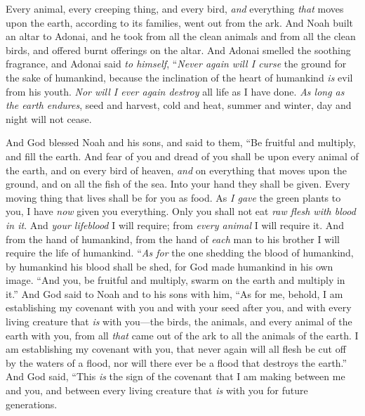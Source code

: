 \begin{biblechapter}
\verse Every animal, every creeping thing, and every bird, \textit{and} everything \textit{that} moves upon the earth, according to its families, went out from the ark.
\verse And Noah built an altar to Adonai, and he took from all the clean animals and from all the clean birds, and offered burnt offerings on the altar.
\verse And Adonai smelled the soothing fragrance, and Adonai said \textit{to himself}, “\textit{Never again will I curse} the ground for the sake of humankind, because the inclination of the heart of humankind \textit{is} evil from his youth. \textit{Nor will I ever again destroy} all life as I have done.
\verse \textit{As long as the earth endures}, seed and harvest, cold and heat, summer and winter, day and night will not cease.
\end{biblechapter}

\begin{biblechapter} %
 And God blessed Noah and his sons, and said to them, “Be fruitful and multiply, and fill the earth.
\verse And fear of you and dread of you shall be upon every animal of the earth, and on every bird of heaven, \textit{and} on everything that moves upon the ground, and on all the fish of the sea. Into your hand they shall be given.
\verse Every moving thing that lives shall be for you as food. As \textit{I gave} the green plants to you, I have \textit{now} given you everything.
\verse Only you shall not eat \textit{raw flesh with blood in it}.
\verse And \textit{your lifeblood} I will require; from \textit{every animal} I will require it. And from the hand of humankind, from the hand of \textit{each} man to his brother I will require the life of humankind.
\verse “\textit{As for} the one shedding the blood of humankind, 
by humankind his blood shall be shed, 
for God made humankind in his own image.
\verse “And you, be fruitful and multiply, swarm on the earth and multiply in it.”
\verse And God said to Noah and to his sons with him,
\verse “As for me, behold, I am establishing my covenant with you and with your seed after you,
\verse and with every living creature that \textit{is} with you—the birds, the animals, and every animal of the earth with you, from all \textit{that} came out of the ark to all the animals of the earth.
\verse I am establishing my covenant with you, that never again will all flesh be cut off by the waters of a flood, nor will there ever be a flood that destroys the earth.”
\verse And God said, “This \textit{is} the sign of the covenant that I am making between me and you, and between every living creature that \textit{is} with you for future generations.

\end{biblechapter}
